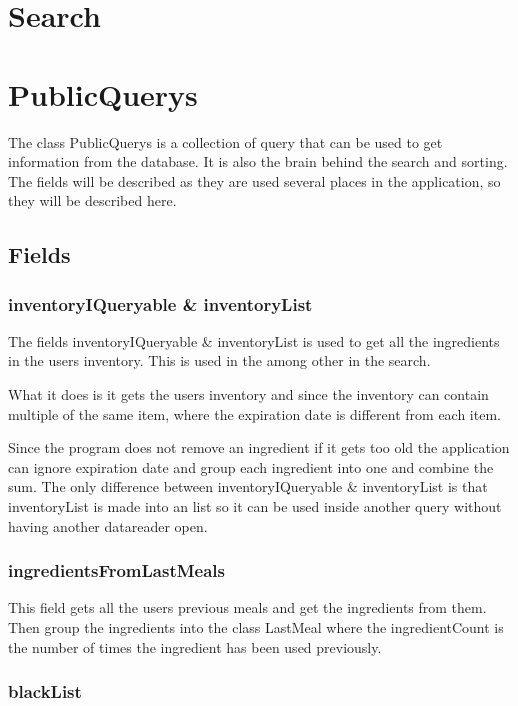 \chapter{Search}

\chapter{PublicQuerys} \label{chp:PublicQuerys}
The class PublicQuerys is a collection of query that can be used to get information from the database. It is also the brain behind the search and sorting.
The fields will be described as they are used several places in the application, so they will be described here.

\section{Fields}
\subsection{inventoryIQueryable \& inventoryList}
The fields inventoryIQueryable \& inventoryList is used to get all the ingredients in the users inventory. This is used in the among other in the search.

What it does is it gets the users inventory and since the inventory can contain multiple of the same item, where the expiration date is different from each item.

Since the program does not remove an ingredient if it gets too old the application can ignore expiration date and group each ingredient into one and combine the sum. The only difference between inventoryIQueryable \& inventoryList is that inventoryList is made into an list so it can be used inside another query without having another datareader open.

\subsection{ingredientsFromLastMeals}
This field gets all the users previous meals and get the ingredients from them. Then group the ingredients into the class LastMeal where the ingredientCount is the number of times the ingredient has been used previously.

\subsection{blackList} \label{ssc:blacklist}

